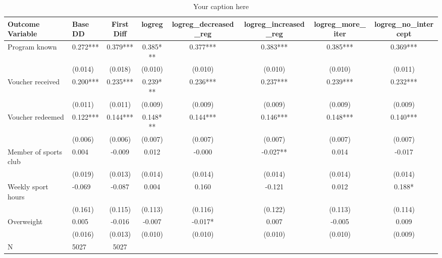 \begin{sidewaystable*}
\centering
\begin{tabular}{llcccccc}
\hline
Outcome Variable & Base DD & First Diff & logreg & logreg_decreased_reg & logreg_increased_reg & logreg_more_iter & logreg_no_intercept \\
\hline
Program known & 0.272*** & 0.379*** & 0.385*** & 0.377*** & 0.383*** & 0.385*** & 0.369*** \\
  & (0.014) & (0.018) & (0.010) & (0.010) & (0.010) & (0.010) & (0.011) \\
Voucher received & 0.200*** & 0.235*** & 0.239*** & 0.236*** & 0.237*** & 0.239*** & 0.232*** \\
  & (0.011) & (0.011) & (0.009) & (0.009) & (0.009) & (0.009) & (0.009) \\
Voucher redeemed & 0.122*** & 0.144*** & 0.148*** & 0.144*** & 0.146*** & 0.148*** & 0.140*** \\
  & (0.006) & (0.006) & (0.007) & (0.007) & (0.007) & (0.007) & (0.007) \\
Member of sports club & 0.004 & -0.009 & 0.012 & -0.000 & -0.027** & 0.014 & -0.017 \\
  & (0.019) & (0.013) & (0.014) & (0.014) & (0.014) & (0.014) & (0.014) \\
Weekly sport hours & -0.069 & -0.087 & 0.004 & 0.160 & -0.121 & 0.012 & 0.188* \\
  & (0.161) & (0.115) & (0.113) & (0.116) & (0.122) & (0.113) & (0.114) \\
Overweight & 0.005 & -0.016 & -0.007 & -0.017* & 0.007 & -0.005 & 0.009 \\
  & (0.016) & (0.013) & (0.010) & (0.010) & (0.010) & (0.010) & (0.009) \\
\hline
N & 5027 & 5027  &  &  &  &  \\
\hline
\end{tabular}
\caption{Your caption here}
\label{tab:your_label}
\end{sidewaystable*}